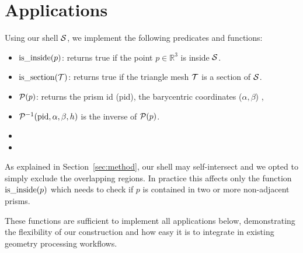 \section{Applications}
\label{sec:applications}
Using our shell $\S$, we implement the following predicates and functions:
\begin{itemize}
    \item $\isinside(p)$: returns true if the point $p \in \mathbb{R}^3$ is inside $\S$. %
    \item $\issection(\T)$: returns true if the triangle mesh $\T$ is a section of $\S$.
    \item $\P(p)$: returns the prism id (pid), the barycentric coordinates ($\alpha,\beta$) , 
    \item $\P^{-1}(\text{pid},\alpha,\beta,h)$ is the inverse of $\P(p)$.
    \item {}
    \item {}
\end{itemize}

As explained in Section~\ref{sec:method}, our shell may self-intersect and 
we opted to simply exclude the overlapping regions. In practice this affects only the function $\isinside(p)$ which needs to check if $p$ is contained in two or more non-adjacent prisms. 

These functions are sufficient to implement all applications below, demonstrating the flexibility of our construction and how easy it is to integrate in existing geometry processing workflows. %



